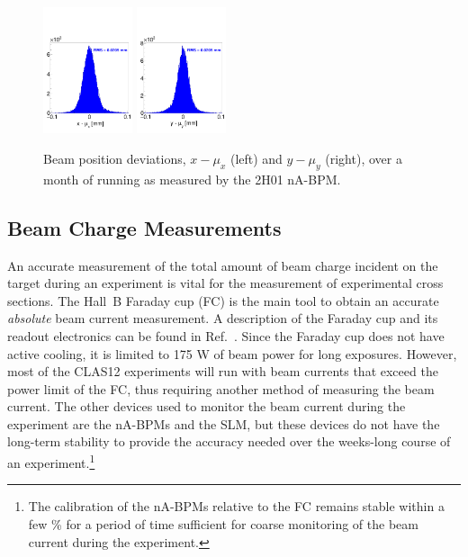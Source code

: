 \begin{figure}[ht]
\begin{center}
\includegraphics[width=0.234\textwidth]{position_2h01x.pdf}
\includegraphics[width=0.234\textwidth]{position_2h01y.pdf}
\caption{Beam position deviations, $x-\mu_x$ (left)  and $y-\mu_y$ (right), over a month of running as measured
  by the 2H01 nA-BPM.}
\label{fig:position}
\end{center}
\end{figure}

\subsection{Beam Charge Measurements}
\label{sec:FC}

An accurate measurement of the total amount of beam charge incident on the target during an experiment is vital
for the measurement of experimental cross sections. The Hall~B Faraday cup (FC) is the main tool to obtain an
accurate {\it absolute}  beam current measurement. A description of the Faraday cup and its readout electronics
can be found in Ref.~\cite{CLAS}. Since the Faraday cup does not have active cooling, it is limited to 175 W of beam
power for long exposures. However, most of the CLAS12 experiments will run with beam currents that exceed the
power limit of the FC, thus requiring another method of measuring the beam current. The other devices used to
monitor the beam current during the experiment are the nA-BPMs and the SLM, but these devices do not have the
long-term stability to provide the accuracy needed over the weeks-long course of an experiment.\footnote{The
  calibration of the nA-BPMs relative to the FC remains stable within a few \% for a period of time sufficient for
  coarse monitoring of the beam current during the experiment.}   

